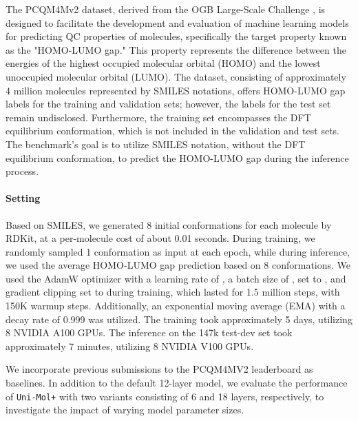 \documentclass{article}
\newcommand{\name}{\texttt{Uni-Mol+}\xspace}
\begin{document}
The PCQM4Mv2 dataset, derived from the OGB Large-Scale Challenge \cite{DBLP:conf/nips/HuFRNDL21}, is designed to facilitate the development and evaluation of machine learning models for predicting QC properties of molecules, specifically the target property known as the "HOMO-LUMO gap." This property represents the difference between the energies of the highest occupied molecular orbital (HOMO) and the lowest unoccupied molecular orbital (LUMO).
The dataset, consisting of approximately 4 million molecules represented by SMILES notations, offers HOMO-LUMO gap labels for the training and validation sets; however, the labels for the test set remain undisclosed. Furthermore, the training set encompasses the DFT equilibrium conformation, which is not included in the validation and test sets. The benchmark's goal is to utilize SMILES notation, without the DFT equilibrium conformation, to predict the HOMO-LUMO gap during the inference process.

\vspace{-6pt}
\paragraph{Setting}
Based on SMILES, we generated 8 initial conformations for each molecule by RDKit, at a per-molecule cost of about 0.01 seconds. During training, we randomly sampled 1 conformation as input  at each epoch, while during inference, we used the average HOMO-LUMO gap prediction based on 8 conformations. We used the AdamW optimizer with a learning rate of , a batch size of ,  set to , and gradient clipping set to  during training, which lasted for 1.5 million steps, with 150K warmup steps. Additionally, an exponential moving average (EMA) with a decay rate of 0.999 was utilized. 
The training took approximately 5 days, utilizing 8 NVIDIA A100 GPUs. 
The inference on the 147k test-dev set took approximately 7 minutes, utilizing 8 NVIDIA V100 GPUs. 

We incorporate previous submissions to the PCQM4MV2 leaderboard as baselines. In addition to the default 12-layer model, we evaluate the performance of \name with two variants consisting of 6 and 18 layers, respectively, to investigate the impact of varying model parameter sizes.

\vspace{-6pt}
\end{document}
